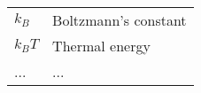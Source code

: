 \begin{abbreviations}


\begin{table}[h]
\centering
\begin{tabular}{ll}
$k_{B}$  & Boltzmann's constant \\
$k_{B}T$ & Thermal energy \\
...      & ... \\
\end{tabular} 
\label{tbl:Abbreviations}
\end{table}


\end{abbreviations}
